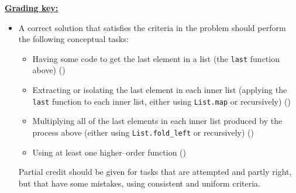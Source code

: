 \documentclass[11pt,fleqn]{article}
\begin{document}
\begin{enumerate}
          \vspace{-4mm}

          \begin{info}{\textbf{\underline{Grading key:}}}

            \begin{itemize}

              \addtolength{\itemsep}{1mm}

              \item A correct solution that satisfies the criteria in the
                    problem should perform the following conceptual tasks:

                    \smallskip

                    \begin{itemize}

                      \addtolength{\itemsep}{0mm}

                      \renewcommand{\labelitemii}{$\ast$}

                      \item Having some code to get the last element in a
                            list (the \texttt{last} function above)
                            ()

                      \item Extracting or isolating the last element in each
                            inner list (applying the \texttt{last} function
                            to each inner list, either using
                            \texttt{List.map} or recursively)
                            ()

                      \item Multiplying all of the last elements in each
                            inner list produced by the process above (either
                            using \texttt{List.fold\_left} or recursively)
                            ()

                      \item Using at least one higher--order function
                            ()

                    \end{itemize}

                    \medskip

                    Partial credit should be given for tasks that are
                    attempted and partly right, but that have some
                    mistakes, using consistent and uniform criteria.


\end{itemize}
\end{info}
\end{enumerate}
\end{document}
